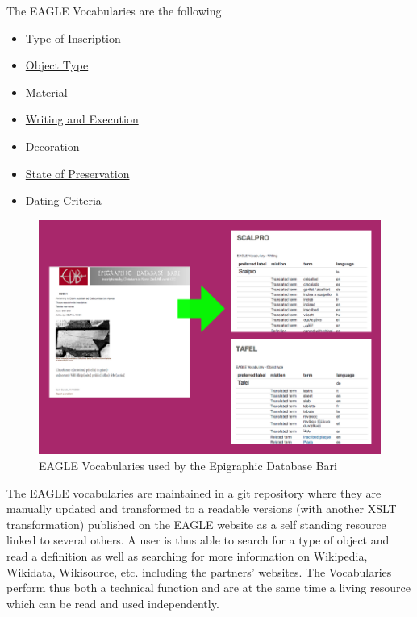 \documentclass[amsthm,ebook]{saparticle}
\begin{document}
The EAGLE Vocabularies are the following

\begin{itemize}
\item \href{http://www.eagle-network.eu/voc/typeins.html}{Type of Inscription}
\item \href{http://www.eagle-network.eu/voc/objtyp.html}{Object Type}
\item \href{http://www.eagle-network.eu/voc/material.html}{Material}
\item \href{http://www.eagle-network.eu/voc/writing.html}{Writing and Execution} 
\item \href{http://www.eagle-network.eu/voc/decor.html}{Decoration} 
\item \href{http://www.eagle-network.eu/voc/statepreserv.html}{State of Preservation} 
\item \href{http://www.eagle-network.eu/voc/dates.html}{Dating Criteria} 
\end{itemize}


\begin{figure}[htbp] \includegraphics[width=\columnwidth]{edb.png} \caption[]{EAGLE Vocabularies used by the Epigraphic Database Bari} \end{figure}

The EAGLE vocabularies are maintained in a git repository where they are manually updated and transformed to a readable versions (with another XSLT transformation) published on the EAGLE website as a self standing resource linked to several others. A user is thus able to search for a type of object and read a definition as well as searching for more information on Wikipedia, Wikidata, Wikisource, etc. including the partners' websites. The Vocabularies perform thus both a technical function and are at the same time a living resource which can be read and used independently.
\end{document}
